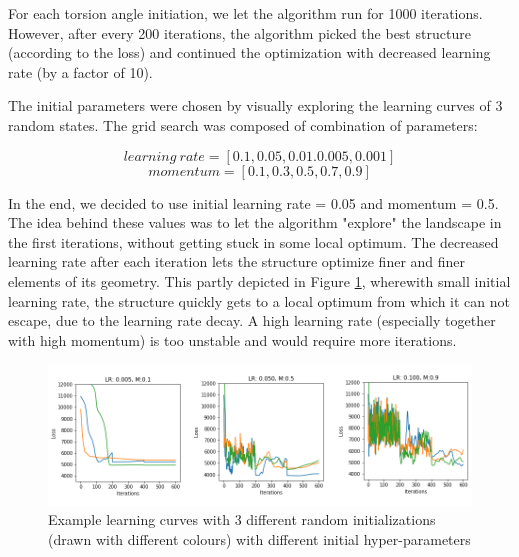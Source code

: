For each torsion angle initiation, we let the algorithm run for 1000 iterations. However, after every 200 iterations, the algorithm picked the best structure (according to the loss) and continued the optimization with decreased learning rate (by a factor of 10).

The initial parameters were chosen by visually exploring the learning curves of 3 random states. The grid search was composed of combination of parameters:

$$learning~rate = [0.1, 0.05, 0.01. 0.005, 0.001]$$
$$momentum = [0.1, 0.3, 0.5, 0.7, 0.9]$$

In the end, we decided to use initial learning rate = 0.05 and momentum = 0.5. The idea behind these values was to let the algorithm "explore" the landscape in the first iterations, without getting stuck in some local optimum. The decreased learning rate after each iteration lets the structure optimize finer and finer elements of its geometry. This partly depicted in Figure \ref{fig:learning_curves}, wherewith small initial learning rate, the structure quickly gets to a local optimum from which it can not escape, due to the learning rate decay. A high learning rate (especially together with high momentum) is too unstable and would require more iterations. 

\begin{figure}
    \centering
    \includegraphics[width=\linewidth]{imgs_tomas/learning_curves.png}
    \caption{Example learning curves with 3 different random initializations (drawn with different colours) with different initial hyper-parameters}
    \label{fig:learning_curves}
\end{figure}

